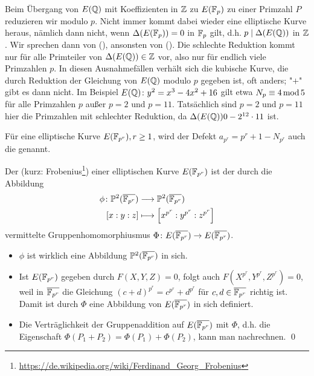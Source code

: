 \begin{bem}
	Beim Übergang von $E(\QQ)$ mit Koeffizienten in $\ZZ$ zu $E(\FF_p)$ zu einer Primzahl $P$ reduzieren wir modulo $p$.
	Nicht immer kommt dabei wieder eine elliptische Kurve heraus, nämlich dann nicht, wenn $\Delta(E(\FF_p)) = 0$ in $\FF_p$ gilt, d.h. $p \mid \Delta(E(\QQ))$ in $\ZZ$.
	Wir sprechen dann von  (), ansonsten von  ().  
	Die schlechte Reduktion kommt nur für alle Primteiler von $\Delta(E(\QQ)) \in \ZZ$ vor, also nur für endlich viele Primzahlen $p$.
	In diesen Ausnahmefällen verhält sich die kubische Kurve, die durch Reduktion der Gleichung von $E(\QQ)$ modulo $p$ gegeben ist, oft anders; "$+$" gibt es dann nicht.
	Im Beispiel $E(\QQ) \colon y^2 = x^3-4x^2+16$ gilt etwa $N_p \kon 4 \modu 5$ für alle Primzahlen $p$ außer $p = 2$ und $p=11$.
	Tatsächlich sind $p=2$ und $p=11$ hier die Primzahlen mit schlechter Reduktion, da $\Delta(E(\QQ)) 0 -2^{12} \cdot 11$ ist.
\end{bem}

\begin{defn}
	Für eine elliptische Kurve $E(\FF_{p^r}), r \geq 1$, wird der Defekt $a_{p^r} = p^r + 1 - N_{p^r}$ auch die  genannt.
\end{defn}

\begin{defn}[Frobeniusendomorphismus]
	Der  (kurz: Frobenius\footnote{\url{https://de.wikipedia.org/wiki/Ferdinand_Georg_Frobenius}}) einer elliptischen Kurve $E(\FF_{p^r})$ ist der durch die Abbildung
	\begin{equation}
	\begin{aligned}
		\phi \colon \PP^2(\overline{\FF_{p^r}}) &\longrightarrow \PP^2(\overline{\FF_{p^r}}) \\
		[x:y:z] &\longmapsto \benbrace*{x^{p^r} : y^{p^r} : z^{p^r}}
	\end{aligned}
	\end{equation}
	vermittelte Gruppenhomomorphiusmus $\Phi\colon E(\overline{\FF_{p^r}}) \rightarrow E(\overline{\FF_{p^r}})$.
\end{defn}

	\begin{itemize}
		\item $\phi$ ist wirklich eine Abbildung $\PP^2(\overline{\FF_{p^r}})$ in sich.
		\item Ist $E(\FF_{p^r})$ gegeben durch $F(X,Y,Z) = 0$, folgt auch $F(X^{p^r},Y^{p^r},Z^{p^r}) = 0$, weil in $\overline{\FF_{p^r}}$ die Gleichung $(c+d)^{p^r} = c^{p^r} + d^{p^r}$ für $c,d \in \overline{\FF_{p^r}}$ richtig ist.
		Damit ist durch $\Phi$ eine Abbildung von $E(\overline{\FF_{p^r}})$ in sich definiert.
		\item Die Verträglichkeit der Gruppenaddition auf $E(\overline{\FF_{p^r}})$ mit $\Phi$, d.h. die Eigenschaft $\Phi(P_1+P_2) = \Phi(P_1) + \Phi(P_2)$, kann man nachrechnen. \qed
	\end{itemize}
	
